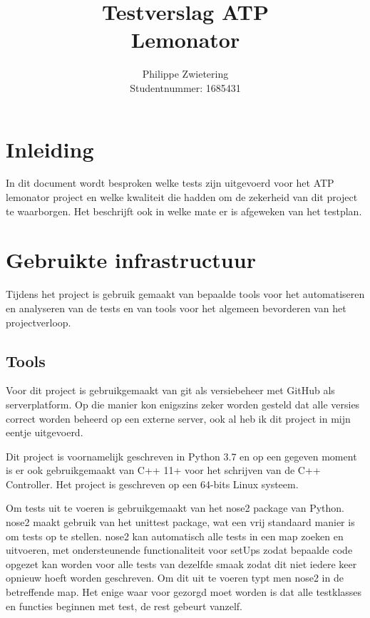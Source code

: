 \documentclass{article}
\title{Testverslag ATP\\
		   Lemonator}
\author{Philippe Zwietering\\
	           Studentnummer: 1685431}
\begin{document}
	\maketitle
      	
    \clearpage
    
    \section{Inleiding}
    
    In dit document wordt besproken welke tests zijn uitgevoerd voor het ATP lemonator project en welke kwaliteit die hadden om de zekerheid van dit project te waarborgen. Het beschrijft ook in welke mate er is afgeweken van het testplan.
    
    \section{Gebruikte infrastructuur} 
    Tijdens het project is gebruik gemaakt van bepaalde tools voor het automatiseren en analyseren van de tests en van tools voor het algemeen bevorderen van het projectverloop.
    
    \subsection{Tools}
    Voor dit project is gebruikgemaakt van git als versiebeheer met GitHub als serverplatform. Op die manier kon enigszins zeker worden gesteld dat alle versies correct worden beheerd op een externe server, ook al heb ik dit project in mijn eentje uitgevoerd. 
    
    Dit project is voornamelijk geschreven in Python 3.7 en op een gegeven moment is er ook gebruikgemaakt van C++ 11+ voor het schrijven van de C++ Controller. Het project is geschreven op een 64-bits Linux systeem. 
    
    Om tests uit te voeren is gebruikgemaakt van het nose2 package van Python. nose2 maakt gebruik van het unittest package, wat een vrij standaard manier is om tests op te stellen. nose2 kan automatisch alle tests in een map zoeken en uitvoeren, met ondersteunende functionaliteit voor setUps zodat bepaalde code opgezet kan worden voor alle tests van dezelfde smaak zodat dit niet iedere keer opnieuw hoeft worden geschreven. Om dit uit te voeren typt men nose2 in de betreffende map. Het enige waar voor gezorgd moet worden is dat alle testklasses en functies beginnen met test, de rest gebeurt vanzelf.
    
\end{document}
